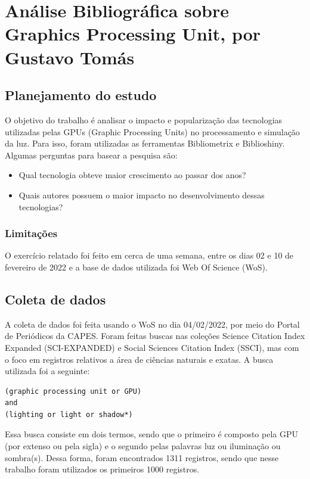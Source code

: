
\chapter{Análise Bibliográfica sobre Graphics Processing Unit, por Gustavo Tomás}

\section{Planejamento do estudo}

O objetivo do trabalho é analisar o impacto e popularização das tecnologias utilizadas pelas GPUs (Graphic Processing Units) no processamento e simulação da luz. Para isso, foram utilizadas as ferramentas Bibliometrix e Biblioshiny. Algumas perguntas para basear a pesquisa são:

\begin{itemize}
    \item Qual tecnologia obteve maior crescimento ao passar dos anos?
    \item Quais autores possuem o maior impacto no desenvolvimento dessas tecnologias?
\end{itemize}

\subsection{Limitações} O exercício relatado foi feito em cerca de uma semana, entre os dias 02 e 10 de fevereiro de 2022 e a base de dados utilizada foi Web Of Science (WoS).

\section{Coleta de dados}

A coleta de dados foi feita usando o WoS no dia 04/02/2022, por meio do Portal de Periódicos da CAPES. Foram feitas buscas nas coleções Science Citation Index Expanded (SCI-EXPANDED) e Social Sciences Citation Index (SSCI), mas com o foco em registros relativos a área de ciências naturais e exatas. A busca utilizada foi a seguinte:

\begin{verbatim}
(graphic processing unit or GPU) 
and
(lighting or light or shadow*)
\end{verbatim}

Essa busca consiste em dois termos, sendo que o primeiro é composto pela GPU (por extenso ou pela sigla) e o segundo pelas palavras luz ou iluminação ou sombra(s). Dessa forma, foram encontrados 1311 registros, sendo que nesse trabalho foram utilizados os primeiros 1000 registros.

